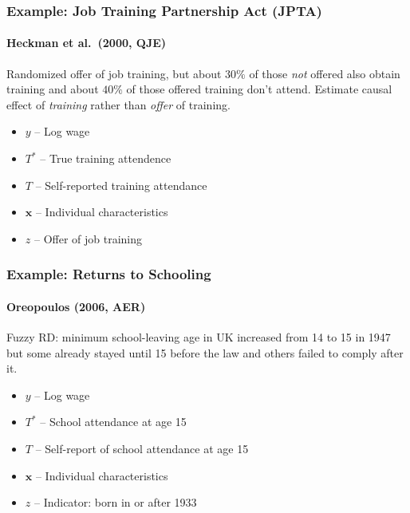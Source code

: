 \documentclass{beamer}
\begin{document}
%
\begin{frame}
  \frametitle{Example: Job Training Partnership Act (JPTA)}
\framesubtitle{Heckman et al.\ (2000, QJE)}
Randomized offer of job training, but about $30\%$ of those \emph{not} offered also obtain training and about $40\%$ of those offered training don't attend. Estimate causal effect of \emph{training} rather than \emph{offer} of training.

\begin{itemize}
  \item $y$ -- Log wage 
  \item $T^*$ -- True training attendence
  \item $T$ -- Self-reported training attendance
  \item $\mathbf{x}$ -- Individual characteristics
  \item $z$ -- Offer of job training
\end{itemize}
   
\end{frame}
\begin{frame}
  \frametitle{Example: Returns to Schooling} 
\framesubtitle{Oreopoulos (2006, AER)}
Fuzzy RD: minimum school-leaving age in UK increased from 14 to 15 in 1947 but some already stayed until 15 before the law and others failed to comply after it.
\begin{itemize}
  \item $y$ -- Log wage 
  \item $T^*$ -- School attendance at age 15
  \item $T$ -- Self-report of school attendance at age 15
  \item $\mathbf{x}$ -- Individual characteristics
  \item $z$ -- Indicator: born in or after 1933
\end{itemize}
   
\end{frame}
\end{document}
